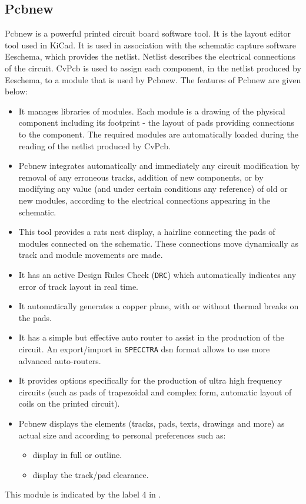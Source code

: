 \subsection {Pcbnew}
 Pcbnew is a powerful printed circuit board software
tool. It is the layout editor tool used in KiCad. %
It
is used in association with the schematic capture software Eeschema,
which provides the netlist. Netlist describes the electrical
connections of the circuit. CvPcb is used to assign each component, in
the netlist produced by Eeschema, to a module that is used by
Pcbnew. The features of Pcbnew are given below:
\begin{itemize}
\item It manages libraries of modules. Each module is a drawing of the
  physical component including its footprint - the
  layout of pads providing connections to the component. The required
  modules are automatically loaded during the reading of the netlist
  produced by CvPcb.
\item Pcbnew integrates automatically and immediately any circuit
  modification by removal of any erroneous tracks, addition of 
  new components, or by modifying any value (and under certain
  conditions any reference) of old or new modules, according to
  the electrical connections appearing in the schematic.   
\item This tool provides a rats nest display, a hairline connecting
  the pads of modules connected on the schematic. These
  connections move dynamically as track and module movements are
  made. 
\item It has an active Design Rules Check ({\tt DRC}) which
  automatically indicates any error of track layout in real time. 
\item It automatically generates a copper plane, with or without
  thermal breaks on the pads.  
\item It has a simple but effective auto router to assist in the
  production of the circuit. An export/import in {\tt SPECCTRA}
  dsn format allows to use more advanced
  auto-routers.  
\item It provides options specifically for the production of ultra
  high frequency circuits (such as pads of trapezoidal and complex
  form, automatic layout of coils on the printed circuit).  
\item Pcbnew displays the elements (tracks, pads, texts, drawings and
  more) as actual size and according to personal preferences such as: 
\begin{itemize}
\item display in full or outline.
\item display the track/pad clearance.
\end{itemize}
\end{itemize}
This module is indicated by the label 4 in
.
